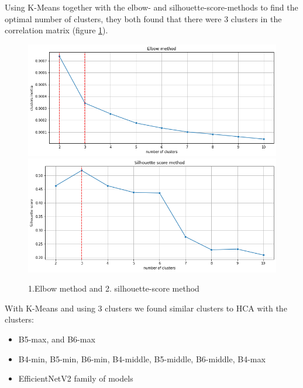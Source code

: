 \documentclass[10pt,letterpaper]{article}
\begin{document}
Using K-Means together with the elbow- and silhouette-score-methods to find the optimal number of clusters, they both found that there were 3 clusters in the correlation matrix (figure \ref{marker11}).
\begin{figure}[h!]
  \caption{1.Elbow method and 2. silhouette-score method}
  \centering
  \includegraphics[scale=0.25]{results/eda/elbow.png}
  \includegraphics[scale=0.25]{results/eda/silhouette.png}
  \label{marker11}
\end{figure}

With K-Means and using 3 clusters we found similar clusters to HCA with the clusters:
\begin{itemize}
    \item B5-max, and B6-max
    \item B4-min, B5-min, B6-min, B4-middle, B5-middle, B6-middle, B4-max
    \item EfficientNetV2 family of models
\end{itemize}
\end{document}
